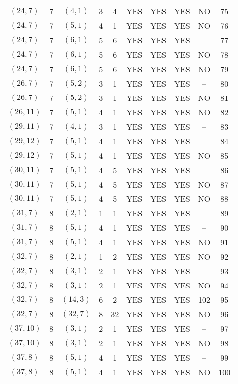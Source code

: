 \begin{longtable}{|c|c|c|c|c|c|c|c|c|c|}
$(24, 7)$ & 7 & $(4, 1)$ & 3 & 4 & YES & YES & YES & NO & 75\\
$(24, 7)$ & 7 & $(5, 1)$ & 4 & 1 & YES & YES & YES & NO & 76\\
$(24, 7)$ & 7 & $(6, 1)$ & 5 & 6 & YES & YES & YES & -- & 77\\
$(24, 7)$ & 7 & $(6, 1)$ & 5 & 6 & YES & YES & YES & NO & 78\\
$(24, 7)$ & 7 & $(6, 1)$ & 5 & 6 & YES & YES & YES & NO & 79\\
$(26, 7)$ & 7 & $(5, 2)$ & 3 & 1 & YES & YES & YES & -- & 80\\
$(26, 7)$ & 7 & $(5, 2)$ & 3 & 1 & YES & YES & YES & NO & 81\\
$(26, 11)$ & 7 & $(5, 1)$ & 4 & 1 & YES & YES & YES & NO & 82\\
$(29, 11)$ & 7 & $(4, 1)$ & 3 & 1 & YES & YES & YES & -- & 83\\
$(29, 12)$ & 7 & $(5, 1)$ & 4 & 1 & YES & YES & YES & -- & 84\\
$(29, 12)$ & 7 & $(5, 1)$ & 4 & 1 & YES & YES & YES & NO & 85\\
$(30, 11)$ & 7 & $(5, 1)$ & 4 & 5 & YES & YES & YES & -- & 86\\
$(30, 11)$ & 7 & $(5, 1)$ & 4 & 5 & YES & YES & YES & NO & 87\\
$(30, 11)$ & 7 & $(5, 1)$ & 4 & 5 & YES & YES & YES & NO & 88\\
$(31, 7)$ & 8 & $(2, 1)$ & 1 & 1 & YES & YES & YES & -- & 89\\
$(31, 7)$ & 8 & $(5, 1)$ & 4 & 1 & YES & YES & YES & -- & 90\\
$(31, 7)$ & 8 & $(5, 1)$ & 4 & 1 & YES & YES & YES & NO & 91\\
$(32, 7)$ & 8 & $(2, 1)$ & 1 & 2 & YES & YES & YES & NO & 92\\
$(32, 7)$ & 8 & $(3, 1)$ & 2 & 1 & YES & YES & YES & -- & 93\\
$(32, 7)$ & 8 & $(3, 1)$ & 2 & 1 & YES & YES & YES & NO & 94\\
$(32, 7)$ & 8 & $(14, 3)$ & 6 & 2 & YES & YES & YES & 102 & 95\\
$(32, 7)$ & 8 & $(32, 7)$ & 8 & 32 & YES & YES & YES & NO & 96\\
$(37, 10)$ & 8 & $(3, 1)$ & 2 & 1 & YES & YES & YES & -- & 97\\
$(37, 10)$ & 8 & $(3, 1)$ & 2 & 1 & YES & YES & YES & NO & 98\\
$(37, 8)$ & 8 & $(5, 1)$ & 4 & 1 & YES & YES & YES & -- & 99\\
$(37, 8)$ & 8 & $(5, 1)$ & 4 & 1 & YES & YES & YES & NO & 100\\

\end{longtable}
